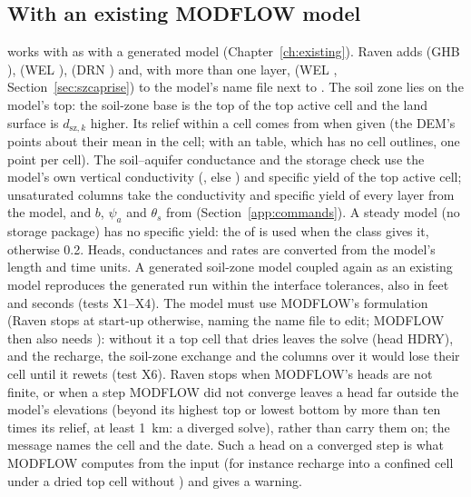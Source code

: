 \subsection{With an existing MODFLOW model}\label{sec:szexisting}
 works with  as with a generated model (Chapter~\ref{ch:existing}). Raven adds
 (GHB ),  (WEL ),  (DRN )
and, with more than one layer,  (WEL , Section~\ref{sec:szcaprise}) to the model's name
file next to . The soil zone lies on the model's top: the soil-zone base is the top
of the top active cell and the land surface is $d_{\mathrm{sz},k}$ higher. Its relief within a cell comes from 
when given (the DEM's points about their mean in the cell; with an  table, which has no cell
outlines, one point per cell). The soil--aquifer conductance and the storage check use the model's own vertical
conductivity (, else ) and specific yield of the top active cell; unsaturated columns take the
conductivity and specific yield of every layer from the model, and $b$, $\psi_a$ and $\theta_s$ from
 (Section~\ref{app:commands}). A steady model (no storage package) has no specific yield: the
 of  is used when the class gives it, otherwise 0.2. Heads, conductances and rates are converted from the model's
length and time units. A generated soil-zone model coupled again as an existing model reproduces the generated run
within the interface tolerances, also in feet and seconds (tests X1--X4).
The model must use MODFLOW's  formulation (Raven stops at start-up otherwise, naming the name file to edit;
MODFLOW then also needs ): without it a top cell that dries leaves the solve (head
HDRY), and the recharge, the soil-zone exchange and the columns over it would lose their cell until it rewets (test X6). Raven stops when MODFLOW's heads are not finite, or when a step MODFLOW did not converge leaves a head far outside the
model's elevations (beyond its highest top or lowest bottom by more than ten times its relief, at least 1~km: a diverged
solve), rather than carry them on; the message names the cell and the date. Such a head on a converged step is what
MODFLOW computes from the input (for instance recharge into a confined cell under a dried top cell without
) and gives a warning.

